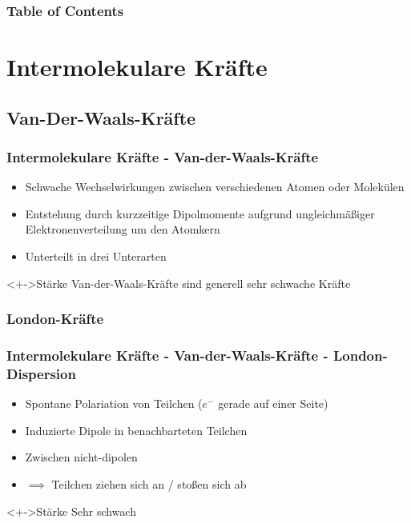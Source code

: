 \begin{frame}
\frametitle{Table of Contents}
\tableofcontents
\end{frame}


\section{Intermolekulare Kräfte}
\subsection{Van-Der-Waals-Kräfte}
\begin{frame}
\frametitle{Intermolekulare Kräfte - Van-der-Waals-Kräfte}
\begin{itemize}
	\item<+-> Schwache Wechselwirkungen zwischen verschiedenen Atomen oder Molekülen
	\item<+-> Entstehung durch kurzzeitige Dipolmomente aufgrund ungleichmäßiger Elektronenverteilung um den Atomkern
	\item<+-> Unterteilt in drei Unterarten
\end{itemize}
\begin{block}<+->{Stärke}
	Van-der-Waals-Kräfte sind generell sehr schwache Kräfte
\end{block}
\end{frame}

\subsubsection{London-Kräfte}
\begin{frame}
\frametitle{Intermolekulare Kräfte - Van-der-Waals-Kräfte - London-Dispersion}
\begin{itemize}
	\item<+-> Spontane Polariation von Teilchen ($e^-$  gerade auf einer Seite)
	\item<+-> Induzierte Dipole in benachbarteten Teilchen
	\item<+-> Zwischen nicht-dipolen
	\item<+-> $\implies$ Teilchen ziehen sich an / stoßen sich ab
\end{itemize}
\begin{block}<+->{Stärke}
	Sehr schwach
\end{block}
\end{frame}

